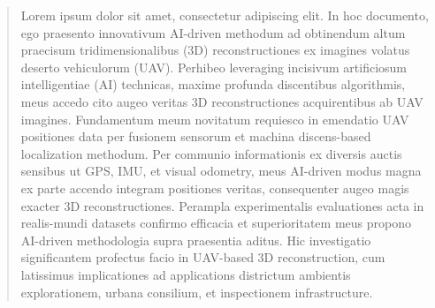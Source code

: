 \documentclass[conference,]{IEEEtran}
\begin{document}
%








\maketitle

\begin{abstract}
Lorem ipsum dolor sit amet, consectetur adipiscing elit. In hoc
documento, ego praesento innovativum AI-driven methodum ad obtinendum
altum praecisum tridimensionalibus (3D) reconstructiones ex imagines
volatus deserto vehiculorum (UAV). Perhibeo leveraging incisivum
artificiosum intelligentiae (AI) technicas, maxime profunda discentibus
algorithmis, meus accedo cito augeo veritas 3D reconstructiones
acquirentibus ab UAV imagines. Fundamentum meum novitatum requiesco in
emendatio UAV positiones data per fusionem sensorum et machina
discens-based localization methodum. Per communio informationis ex
diversis auctis sensibus ut GPS, IMU, et visual odometry, meus AI-driven
modus magna ex parte accendo integram positiones veritas, consequenter
augeo magis exacter 3D reconstructiones. Perampla experimentalis
evaluationes acta in realis-mundi datasets confirmo efficacia et
superioritatem meus propono AI-driven methodologia supra praesentia
aditus. Hic investigatio significantem profectus facio in UAV-based 3D
reconstruction, cum latissimus implicationes ad applications districtum
ambientis explorationem, urbana consilium, et inspectionem
infrastructure.
\end{abstract}
\end{document}
